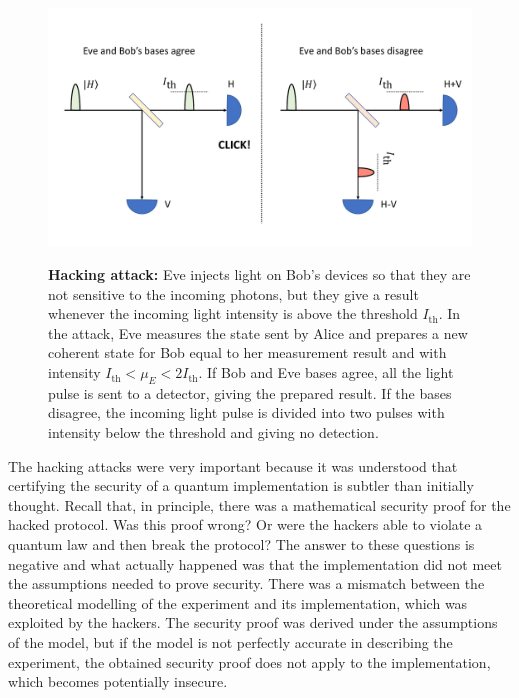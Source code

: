 \documentclass[a4paper]{article}
\begin{document}
\begin{figure}
\begin{center}
  \includegraphics[width=12cm]{Hacking.pdf}\\
  \caption{\textbf{Hacking attack:} Eve injects light on Bob's devices so that they are not sensitive to the incoming photons, but they give a result whenever the incoming light intensity is above the threshold $I_{\text{th}}$. In the attack, Eve measures the state sent by Alice and prepares a new coherent state for Bob equal to her measurement result and with intensity $I_{\text{th}}<\mu_E<2I_{\text{th}}$. If Bob and Eve bases agree, all the light pulse is sent to a detector, giving the prepared result. If the bases disagree, the incoming light pulse is divided into two pulses with intensity below the threshold and giving no detection.}\label{hackingfig}
\end{center}
\end{figure}


The hacking attacks were very important because it was understood that  certifying the security of a quantum implementation is subtler than initially thought. Recall that, in principle, there was a mathematical security proof for the hacked protocol. Was this proof wrong? Or were the hackers able to violate a quantum law and then break the protocol? The answer to these questions is negative and what actually happened was that the implementation did not meet the assumptions needed to prove security. There was a mismatch between the theoretical modelling of the experiment and its implementation, which was exploited by the hackers. The security proof was derived under the assumptions of the model, but if the model is not perfectly accurate in describing the experiment, the obtained security proof does not apply to the implementation, which becomes potentially insecure. 
\end{document}
